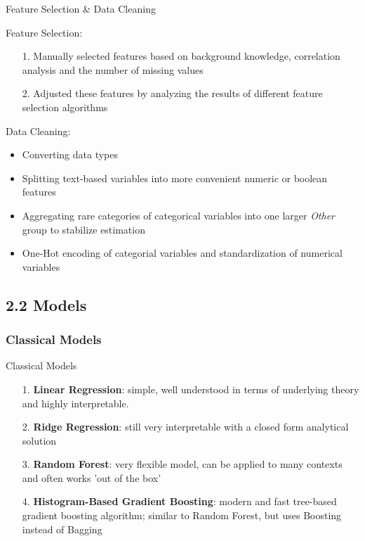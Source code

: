 \documentclass[ngerman,inputenc]{beamer}
\begin{document}
\begin{frame}{Feature Selection \& Data Cleaning}

  Feature Selection:
  \begin{itemize}
    \item[1.] Manually selected features based on background knowledge, correlation analysis and the number of missing values
    \item[2.] Adjusted these features by analyzing the results of different feature selection algorithms
  \end{itemize}

  \pause

  \hspace{5pt}

  Data Cleaning:
  \begin{itemize}
    \item Converting data types
    \item Splitting text-based variables into more convenient numeric or boolean features
    \item Aggregating rare categories of categorical variables into one larger \emph{Other} group to stabilize estimation
    \item One-Hot encoding of categorial variables and standardization of numerical variables
  \end{itemize}

\end{frame}



\subsection{2.2 Models}

\subsubsection{Classical Models}

\begin{frame}{Classical Models}
  \begin{itemize}
    \item[1.] \textbf{Linear Regression}: simple, well understood in terms of underlying theory and highly interpretable.
    \item[2.] \textbf{Ridge Regression}: still very interpretable with a closed form analytical solution
    \item[3.] \textbf{Random Forest}: very flexible model, can be applied to many contexts and often works 'out of the box'
    \item[4.] \textbf{Histogram-Based Gradient Boosting}: modern and fast tree-based gradient boosting algorithm; similar to Random Forest, but uses Boosting instead of Bagging
  \end{itemize}

\end{frame}
\end{document}
